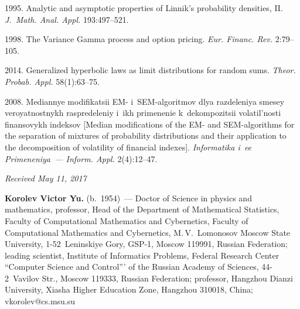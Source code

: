 \begin{multicols}{2}
{{\begin{thebibliography}{99}
\pagebreak

 1995. 
Analytic and asymptotic properties of Linnik's probability densities, II. 
\textit{J.~Math. Anal. Appl.} 193:497--521.



 1998. 
The Variance Gamma process and option
pricing. \textit{Eur. Financ. Rev.} 2:79--105.



 2014. 
Generalized hyperbolic laws as limit distributions for random sums. 
\textit{Theor. Probab. Appl.} 58(1):63--75.

\columnbreak 

 2008. 
Mediannye modifikatsii EM- i~SEM-al\-go\-rit\-mov dlya razdeleniya smesey 
veroyatnostnykh raspredeleniy i~ikh primenenie 
k~dekompozitsii volatil'nosti finansovykh indeksov [Median modifications 
of the EM- and SEM-algorithms for the separation of mixtures of probability 
distributions and their application to the decomposition of volatility 
of financial indexes]. \textit{Informatika i~ee Primeneniya~--- Inform. Appl.} 
2(4):12--47.
\end{thebibliography}

 }
 }

\end{multicols}

\vspace*{-3pt}

\hfill{\small\textit{Received May 11, 2017}}


\Contrl

\noindent
\textbf{Korolev Victor Yu.} (b.\ 1954)~--- 
Doctor of Science in physics and mathematics, professor, Head of the Department 
of Mathematical Statistics, Faculty of Computational Mathematics and 
Cybernetics, Faculty of Computational Mathematics and Cybernetics, 
M.\,V.~Lomonosov Moscow State University, 1-52~Leninskiye Gory, GSP-1, Moscow 119991, 
Russian Federation; leading scientist, Institute of Informatics Problems, 
Federal Research Center ``Computer Science and Control''' 
of the Russian Academy of Sciences, 44-2~Vavilov Str., Moscow 119333,  
Russian Federation;  professor, Hangzhou Dianzi University, 
Xiasha Higher Education Zone, Hangzhou 310018, China; \mbox{vkorolev@cs.msu.su}


\label{end\stat}


\renewcommand{\bibname}{\protect\rm Литература} 